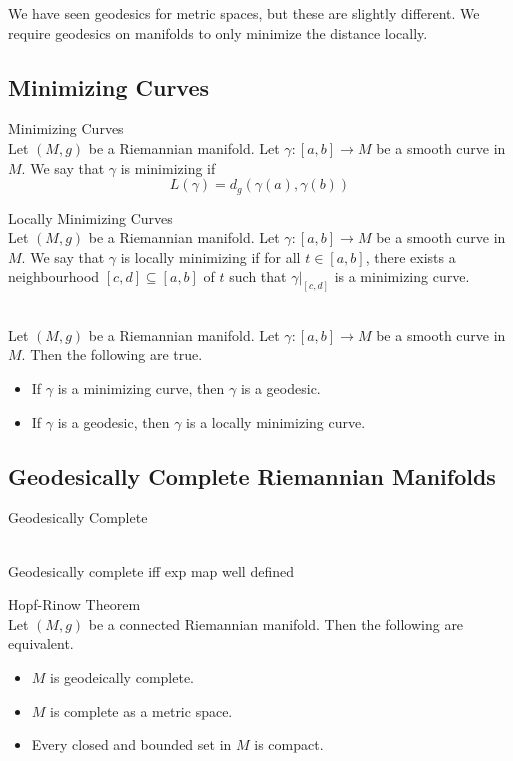 \documentclass[a4paper]{article}
\begin{document}
We have seen geodesics for metric spaces, but these are slightly different. We require geodesics on manifolds to only minimize the distance locally. 

\subsection{Minimizing Curves}
\begin{defn}{Minimizing Curves}{}\\
Let $(M,g)$ be a Riemannian manifold. Let $\gamma:[a,b]\to M$ be a smooth curve in $M$. We say that $\gamma$ is minimizing if $$L(\gamma)=d_g(\gamma(a),\gamma(b))$$
\end{defn}

\begin{defn}{Locally Minimizing Curves}{}\\
Let $(M,g)$ be a Riemannian manifold. Let $\gamma:[a,b]\to M$ be a smooth curve in $M$. We say that $\gamma$ is locally minimizing if for all $t\in[a,b]$, there exists a neighbourhood $[c,d]\subseteq[a,b]$ of $t$ such that $\gamma|_{[c,d]}$ is a minimizing curve. 
\end{defn}

\begin{prp}{}{}\\
Let $(M,g)$ be a Riemannian manifold. Let $\gamma:[a,b]\to M$ be a smooth curve in $M$. Then the following are true. 
\begin{itemize}
\item If $\gamma$ is a minimizing curve, then $\gamma$ is a geodesic. 
\item If $\gamma$ is a geodesic, then $\gamma$ is a locally minimizing curve. 
\end{itemize}
\end{prp}

\subsection{Geodesically Complete Riemannian Manifolds}
\begin{defn}{Geodesically Complete}{}
\end{defn}

\begin{prp}{}{}\\
Geodesically complete iff exp map well defined
\end{prp}

\begin{thm}{Hopf-Rinow Theorem}{}\\
Let $(M,g)$ be a connected Riemannian manifold. Then the following are equivalent. 
\begin{itemize}
\item $M$ is geodeically complete. 
\item $M$ is complete as a metric space. 
\item Every closed and bounded set in $M$ is compact. 
\end{itemize}
\end{thm}
\end{document}
